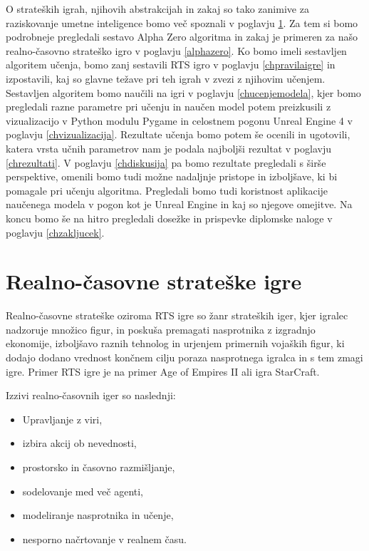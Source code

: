 \documentclass[a4paper, 12pt]{book}
\begin{document}
O strateških igrah, njihovih abstrakcijah in zakaj so tako zanimive za raziskovanje umetne inteligence bomo več spoznali v poglavju \ref{chrts}.
Za tem si bomo podrobneje pregledali sestavo Alpha Zero algoritma in zakaj je primeren za našo realno-časovno strateško igro v poglavju \ref{alphazero}.
Ko bomo imeli sestavljen algoritem učenja, bomo zanj sestavili RTS igro v poglavju \ref{chpravilaigre} in izpostavili, kaj so glavne težave pri teh igrah v zvezi z njihovim učenjem.
Sestavljen algoritem bomo naučili na igri v poglavju \ref{chucenjemodela}, kjer bomo pregledali razne parametre pri učenju in naučen model potem preizkusili z vizualizacijo v Python modulu Pygame in celostnem pogonu Unreal Engine 4 v poglavju \ref{chvizualizacija}.
Rezultate učenja bomo potem še ocenili in ugotovili, katera vrsta učnih parametrov nam je podala najboljši rezultat v poglavju \ref{chrezultati}.
V poglavju \ref{chdiskusija} pa bomo rezultate pregledali s širše perspektive, omenili bomo tudi možne nadaljnje pristope in izboljšave, ki bi pomagale pri učenju algoritma. Pregledali bomo tudi koristnost aplikacije naučenega modela v pogon kot je Unreal Engine in kaj so njegove omejitve.
Na koncu bomo še na hitro pregledali dosežke in prispevke diplomske naloge v poglavju \ref{chzakljucek}.

\chapter{Realno-časovne strateške igre}
\label{chrts}

Realno-časovne strateške oziroma RTS igre so žanr strateških iger, kjer igralec nadzoruje množico figur, in poskuša premagati nasprotnika z izgradnjo ekonomije, izboljšavo raznih tehnolog in urjenjem primernih vojaških figur, ki dodajo dodano vrednost končnem cilju poraza nasprotnega igralca in s tem zmagi igre. 
Primer RTS igre je na primer Age of Empires II ali igra StarCraft. 

Izzivi realno-časovnih iger so naslednji:
\begin{itemize}
	\item Upravljanje z viri,
	\item izbira akcij ob nevednosti,
	\item prostorsko in časovno razmišljanje,
	\item sodelovanje med več agenti,
	\item modeliranje nasprotnika in učenje,
	\item nesporno načrtovanje v realnem času.
\end{itemize}
\end{document}
